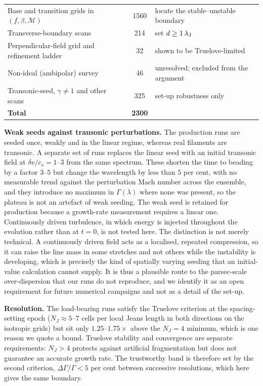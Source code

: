 \documentclass[usenatbib,twoside,twocolumn]{mnras}
\begin{document}
\begin{table}
\begin{tabular}{@{}p{3.0cm}cp{3.5cm}@{}}
Base and transition grids in $(f,\beta,\mathcal{M})$ & 1560 & locate the stable--unstable boundary \\
Transverse-boundary scans & 214 & set $d\geq1\,\lambda_{\rm J}$ \\
Perpendicular-field grid and refinement ladder & 32 & shown to be Truelove-limited \\
Non-ideal (ambipolar) survey & 46 & unresolved; excluded from the argument \\
Transonic-seed, $\gamma\neq1$ and other scans & 325 & set-up robustness only \\
\midrule
\textbf{Total} & \textbf{2300} & \\
\bottomrule
\end{tabular}
\end{table}

\smallskip\noindent\textbf{Weak seeds against transonic perturbations.} The production runs are seeded once, weakly and in the linear regime, whereas real filaments are transonic. A separate set of runs replaces the linear seed with an initial transonic field at $\delta v/c_s=1$--$3$ from the same spectrum. These shorten the time to beading by a factor $3$--$5$ but change the wavelength by less than $5$ per cent, with no measurable trend against the perturbation Mach number across the ensemble, and they introduce no maximum in $\Gamma(\lambda)$ where none was present, so the plateau is not an artefact of weak seeding. The weak seed is retained for production because a growth-rate measurement requires a linear one. Continuously driven turbulence, in which energy is injected throughout the evolution rather than at $t=0$, is not tested here. The distinction is not merely technical. A continuously driven field acts as a localised, repeated compression, so it can raise the line mass in some stretches and not others while the instability is developing, which is precisely the kind of spatially varying seeding that an initial-value calculation cannot supply. It is thus a plausible route to the parsec-scale over-dispersion that our runs do not reproduce, and we identify it as an open requirement for future numerical campaigns and not as a detail of the set-up.

\smallskip\noindent\textbf{Resolution.} The load-bearing runs satisfy the Truelove criterion at the spacing-setting epoch ($N_J\approx5$--$7$ cells per local Jeans length in both directions on the isotropic grids) but sit only $1.25$--$1.75\times$ above the $N_J=4$ minimum, which is one reason we quote a bound. Truelove stability and convergence are separate requirements: $N_J>4$ protects against artificial fragmentation but does not guarantee an accurate growth rate. The trustworthy band is therefore set by the second criterion, $\Delta\Gamma/\Gamma<5$ per cent between successive resolutions, which here gives the same boundary.
\end{document}
